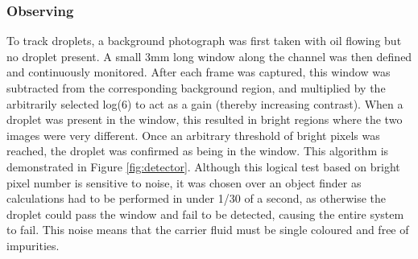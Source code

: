 \documentclass{physics_article_B}
\begin{document}
    \subsubsection{Observing}
    To track droplets, a background photograph was first taken with oil flowing but no droplet present. A small 3mm long window along the channel was then defined and continuously monitored. After each frame was captured, this window was subtracted from the corresponding background region, and multiplied by the arbitrarily selected log(6) to act as a gain (thereby increasing contrast). When a droplet was present in the window, this resulted in bright regions where the two images were very different. Once an arbitrary threshold of bright pixels was reached, the droplet was confirmed as being in the window. This algorithm is demonstrated in Figure \ref{fig:detector}. Although this logical test based on bright pixel number is sensitive to noise, it was chosen over an object finder as calculations had to be performed in under 1/30 of a second, as otherwise the droplet could pass the window and fail to be detected, causing the entire system to fail. This noise means that the carrier fluid must be single coloured and free of impurities. \\
    
\end{document}
